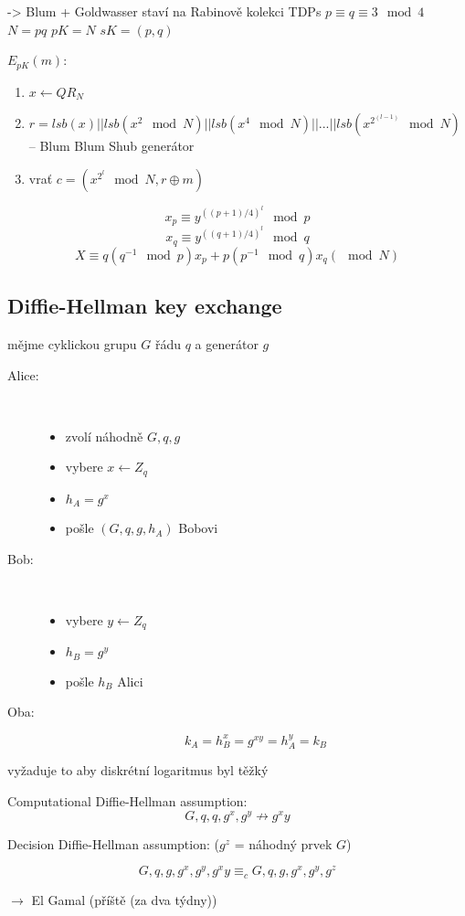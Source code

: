 \documentclass{article}
\begin{document}
-> Blum + Goldwasser
staví na Rabinově kolekci TDPs
$p \equiv q \equiv 3 \mod 4$
$N = pq$
$pK = N$
$sK = (p,q)$

$E_{pK}(m)$:
\begin{enumerate}
\item $x \leftarrow QR_N$
\item $r = lsb(x) || lsb(x^2 \mod N) || lsb(x^4 \mod N) || ... || lsb(x^{2^(l-1)} \mod N)$ -- Blum Blum Shub generátor
\item vrať $c = (x^{2^l} \mod N, r \oplus m)$
\end{enumerate}


$$x_p \equiv y^{((p+1)/4)^l} \mod p$$
$$x_q \equiv y^{((q+1)/4)^l} \mod q$$
$$X \equiv q(q^{-1} \mod  p)x_p + p(p^{-1} \mod q)x_q (\mod N)$$


\subsection{Diffie-Hellman key exchange}
mějme cyklickou grupu $G$ řádu $q$ a generátor $g$
\begin{description}
\item [Alice:] \ 
\begin{itemize}
\item    zvolí náhodně $G,q,g$
\item    vybere $x \leftarrow Z_q$
\item    $h_A = g^x$
\item    pošle $(G, q, g, h_A)$ Bobovi
\end{itemize}
\item [Bob:] \ 
\begin{itemize}
\item    vybere $y \leftarrow Z_q$
\item    $h_B = g^y$
\item    pošle $h_B$ Alici
\end{itemize}

\item [Oba:]
    $$k_A = h_B^x = g^{xy} = h_A^y = k_B$$
\end{description}

vyžaduje to aby diskrétní logaritmus byl těžký

Computational Diffie-Hellman assumption:
$$G,q,q,g^x,g^y \not\rightarrow g^xy$$

Decision Diffie-Hellman assumption:
($g^z$ = náhodný prvek $G$)

$$G,q,g,g^x,g^y,g^xy \equiv_c G,q,g,g^x,g^y,g^z$$



$\rightarrow$ El Gamal (příště (za dva týdny))
\end{document}
